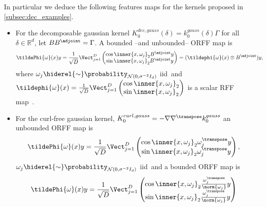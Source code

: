 In particular we deduce the following features maps for the kernels proposed in
\cref{subsec:dec_examples}.
\begin{itemize}
    \item For the decomposable gaussian kernel
    $K_0^{dec,gauss}(\delta)=k_0^{gauss}(\delta)\Gamma$ for all
    $\delta\in\mathbb{R}^d$, let $BB^\adjoint=\Gamma$. A bounded --and
    unbounded-- \acs{ORFF} map is
    \begin{dmath*}
        \tildePhi{\omega}(x)y
        =\frac{1}{\sqrt{D}} \Vect_{j=1}^D
        \begin{pmatrix}
            \cos{\inner{x,\omega_j}_2} B^\adjoint y \\
            \sin{\inner{x,\omega_j}_2}B^\adjoint y
        \end{pmatrix}
        =(\tildephi{\omega}(x)\otimes B^\adjoint)y,
    \end{dmath*}
    where $\omega_j \hiderel{\sim}
    \probability_{\mathcal{N}(0,\sigma^{-2}I_d)}$ \ac{iid}~and
    $\tildephi{\omega}(x)=\frac{1}{\sqrt{D}}\Vect_{j=1}^D
    \begin{pmatrix}
        \cos{\inner{x,\omega_j}_2} \\
        \sin{\inner{x,\omega_j}_2}
    \end{pmatrix}$ is a scalar \acs{RFF}
    map~\citep{Rahimi2007}.
    \item For the curl-free gaussian kernel,
    $K_0^{curl,gauss}=-\nabla\nabla^\transpose k_0^{gauss}$ an unbounded
    \acs{ORFF} map is
    \begin{dmath}
        \label{eq:unbounded_curl_free_orff}
        \tildePhi{\omega}(x)y=\frac{1}{\sqrt{D}}\Vect_{j=1}^D
        \begin{pmatrix}
            \cos{\inner{x,\omega_j}_2}\omega_j^\transpose y \\
            \sin{\inner{x,\omega_j}_2}\omega_j^\transpose y
        \end{pmatrix},
    \end{dmath}
    $\omega_j \hiderel{\sim} \probability_{\mathcal{N}(0,\sigma^{-2}I_d)}$
    \ac{iid}~and a bounded \acs{ORFF} map is
    \begin{dmath*}
        \tildePhi{\omega}(x) y=\frac{1}{\sqrt{D}}\Vect_{j=1}^D
        \begin{pmatrix}
            \cos{\inner{x,\omega_j}_2}\frac{\omega_j^\transpose
            }{\norm{\omega_j}} y \\
            \sin{\inner{x,\omega_j}_2}\frac{\omega_j^\transpose
            }{\norm{\omega_j}} y

\end{pmatrix}
\end{dmath*}
\end{itemize}
